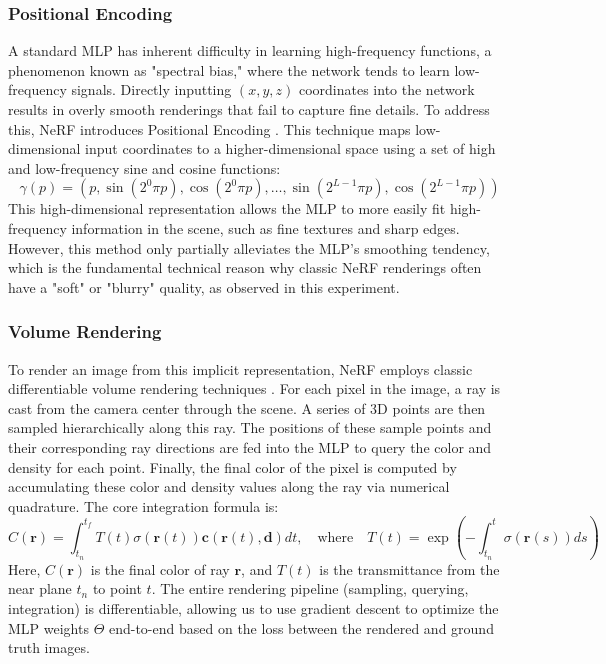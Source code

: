 \documentclass[11pt]{article}
\begin{document}
\subsubsection{Positional Encoding}
A standard MLP has inherent difficulty in learning high-frequency functions, a phenomenon known as "spectral bias," where the network tends to learn low-frequency signals. Directly inputting $(x,y,z)$ coordinates into the network results in overly smooth renderings that fail to capture fine details. To address this, NeRF introduces Positional Encoding \cite{mildenhall2020nerf_pdf}. This technique maps low-dimensional input coordinates to a higher-dimensional space using a set of high and low-frequency sine and cosine functions:
$$ \gamma(p) = (p, \sin(2^0\pi p), \cos(2^0\pi p), \dots, \sin(2^{L-1}\pi p), \cos(2^{L-1}\pi p)) $$
This high-dimensional representation allows the MLP to more easily fit high-frequency information in the scene, such as fine textures and sharp edges. However, this method only partially alleviates the MLP's smoothing tendency, which is the fundamental technical reason why classic NeRF renderings often have a "soft" or "blurry" quality, as observed in this experiment.

\subsubsection{Volume Rendering}
To render an image from this implicit representation, NeRF employs classic differentiable volume rendering techniques \cite{mildenhall2020nerf_pdf}. For each pixel in the image, a ray is cast from the camera center through the scene. A series of 3D points are then sampled hierarchically along this ray. The positions of these sample points and their corresponding ray directions are fed into the MLP to query the color and density for each point. Finally, the final color of the pixel is computed by accumulating these color and density values along the ray via numerical quadrature. The core integration formula is:
$$ C(\mathbf{r}) = \int_{t_n}^{t_f} T(t)\sigma(\mathbf{r}(t))\mathbf{c}(\mathbf{r}(t), \mathbf{d})dt, \quad \text{where} \quad T(t) = \exp\left(-\int_{t_n}^{t} \sigma(\mathbf{r}(s))ds\right) $$
Here, $C(\mathbf{r})$ is the final color of ray $\mathbf{r}$, and $T(t)$ is the transmittance from the near plane $t_n$ to point $t$. The entire rendering pipeline (sampling, querying, integration) is differentiable, allowing us to use gradient descent to optimize the MLP weights $\Theta$ end-to-end based on the loss between the rendered and ground truth images.
\end{document}
